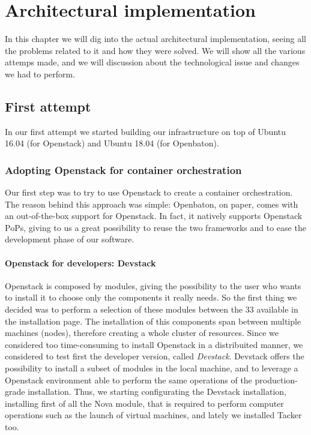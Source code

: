 \chapter{Architectural implementation}
\label{chap:archimpl}
 
In this chapter we will dig into the actual architectural implementation, seeing
all the problems related to it and how they were solved. We will show all the
various attemps made, and we will discussion about the technological issue and
changes we had to perform.

\section{First attempt}

In our first attempt we started building our infrastructure on top of Ubuntu
16.04 (for Openstack) and Ubuntu 18.04 (for Openbaton).

\subsection{Adopting Openstack for container orchestration}

Our first step was to try to use Openstack to create a container orchestration. 
The reason behind this approach was simple: Openbaton, on paper, comes with an 
out-of-the-box support for Openstack. In fact, it natively supports Openstack 
PoPs, giving to us a great possibility to reuse the two frameworks and to ease 
the development phase of our software.
\subsubsection{Openstack for developers: Devstack}
Openstack is composed by modules, giving the possibility to the user who wants 
to install it to choose only the components it really needs. So the first thing 
we decided was to perform a selection of these modules between the 33 available 
in the installation page. The installation of this components span between 
multiple machines (nodes), therefore creating a whole cluster of resources. 
Since we considered too time-consuming to install Openstack in a distribuited 
manner, we considered to test first the developer version, called 
\emph{Devstack}. Devstack offers the possibility to install a subset of modules 
in the local machine, and to leverage a Openstack environment able to perform 
the same operations of the production-grade installation. Thus, we starting 
configurating the Devstack installation, installing first of all the Nova 
module, that is required to perform computer operations such as the launch of 
virtual machines, and lately we installed Tacker too.

